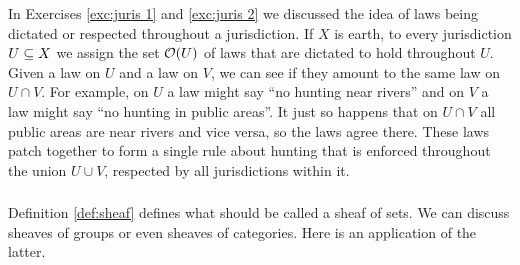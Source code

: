 \documentclass[CT4S-EN-RU]{subfiles}
\begin{document}
\begin{applicationRUS}
\end{applicationRUS}

\begin{exampleENG}
In Exercises \ref{exc:juris 1} and \ref{exc:juris 2} we discussed the idea of laws being dictated or respected throughout a jurisdiction. If $X$ is earth, to every jurisdiction $U\ss X$ we assign the set $\mcO(U)$ of laws that are dictated to hold throughout $U$. Given a law on $U$ and a law on $V$, we can see if they amount to the same law on $U\cap V$. For example, on $U$ a law  might say “no hunting near rivers” and on $V$ a law might say “no hunting in public areas”. It just so happens that on $U\cap V$ all public areas are near rivers and vice versa, so the laws agree there. These laws patch together to form a single rule about hunting that is enforced throughout the union $U\cup V$, respected by all jurisdictions within it.
\end{exampleENG}

\begin{exampleRUS}
\end{exampleRUS}


\subsubsection{}

\begin{blockENG}
Definition \ref{def:sheaf} defines what should be called a sheaf of sets. We can discuss sheaves of groups or even sheaves of categories. Here is an application of the latter.
\end{blockENG}

\begin{blockRUS}
\end{blockRUS}
\end{document}
